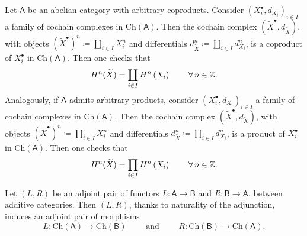\begin{rem}[]
	Let $\mathsf{A}$ be an abelian category with arbitrary coproducts.
	Consider $\left( X_i^{\bullet}, d_{X_i} \right)_{i \in I}$ a family
	of cochain complexes in $\mathrm{Ch}(\mathsf{A})$.
	Then the cochain complex $( \widetilde{X}^{\bullet}, d_{\widetilde{X}} )$, with
	objects $( \widetilde{X}^\bullet )^n \coloneqq \coprod_{i \in I} X_i^n$
	and differentials $d^n_{\widetilde{X}} \coloneqq \coprod_{i \in I} d^n_{X_i}$,
	is a coproduct of $X_i^\bullet$ in $\mathrm{Ch}(\mathsf{A})$.
	Then one checks that
	\begin{equation}
	H^{n}( \widetilde{X} ) = 
	\coprod_{i \in I} H^{n}\left( X_i \right)
	\qquad \,\forall\, n \in \mathbb{Z}
	.\end{equation} 
	Analogously, if $\mathsf{A}$ admits arbitrary products,
	consider $( X_i^{\bullet}, d_{X_i} )_{i \in I}$ a family
	of cochain complexes in $\mathrm{Ch}(\mathsf{A})$.
	Then the cochain complex $( \widetilde{X}^{\bullet}, d_{\widetilde{X}} )$, with
	objects $( \widetilde{X}^\bullet )^n \coloneqq \prod_{i \in I} X_i^n$
	and differentials $d^n_{\widetilde{X}} \coloneqq \prod_{i \in I} d^n_{X_i}$,
	is a product of $X_i^\bullet$ in $\mathrm{Ch}(\mathsf{A})$.
	Then one checks that
	\begin{equation}
	H^{n}( \widetilde{X} ) = 
	\prod_{i \in I} H^{n}\left( X_i \right)
	\qquad \,\forall\, n \in \mathbb{Z}
	.\end{equation} 
\end{rem}

\begin{lem}
	Let $\left(L, R\right)$ be an adjoint pair of functors
	$L\colon\mathsf{A} \to \mathsf{B}$ and $R\colon\mathsf{B} \to \mathsf{A}$,
	between additive categories.
	Then $\left(L, R\right)$, thanks to naturality of the adjunction,
	induces an adjoint pair of morphisms
	\begin{equation}
	L\colon\mathrm{Ch}(\mathsf{A}) \to \mathrm{Ch}(\mathsf{B})
	\qquad \text{ and } \qquad
	R\colon\mathrm{Ch}(\mathsf{B}) \to \mathrm{Ch}(\mathsf{A})
	.\end{equation} 
\end{lem} 

